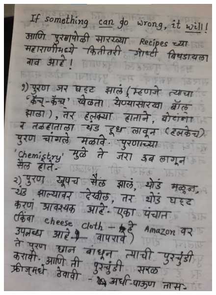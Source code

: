 \documentclass[17pt]{extarticle}  %
\begin{document}
\begin{figure}[h!]
    \centering
    \includegraphics{img/06-s.png}
\end{figure}
\end{document}
